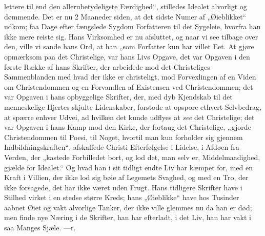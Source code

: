 \documentclass[12pt,a4paper]{book}
\begin{document}
lettere til end den allerubetydeligste Færdighed“, stilledes Idealet alvorligt og dømmende. Det er nu 2 Maaneder siden, at det sidste Numer af „Øieblikket“ udkom; faa Dage efter fængslede Sygdom Forfatteren til det Sygeleie, hvorfra han ikke mere reiste sig.
Hans Virksomhed er nu afsluttet, og naar vi see tilbage over den, ville vi sande hans Ord, at han „som Forfatter kun har villet Eet. At gjøre opmærksom paa det Christelige, var hans Livs Opgave, det var Opgaven i den første Række af hans Skrifter, der arbeidede mod det Christeliges Sammenblanden med hvad der ikke er christeligt, mod Forvexlingen af en Viden om Christendommen og en Forvandlen af Existensen ved Christendommen; det var Opgaven i hans opbyggelige Skrifter, der, med dyb Kjendskab til det menneskelige Hjertes skjulte Lidenskaber, forstode at opspore ethvert Selvbedrag, at spærre enhver Udvei, ad hvilken det kunde udflyes at \emph{see} det Christelige; det var Opgaven i hans Kamp mod den Kirke, der fortaug det Christelige, „gjorde Christendommen til Poesi,
til Noget, hvortil man kun forholder sig gjennem Indbildningskraften“, afskaffede Christi Efterfølgelse i Lidelse, i Afdøen fra Verden, der „kastede Forbilledet bort, og lod det, man selv er, Middelmaadighed, gjælde for Idealet.“ Og hvad han i sit tidligt endte Liv har kæmpet for, med en Kraft i Villien, der ikke lod sig bøie af Legemets Svaghed, og med en Tro, der ikke forsagede, det har ikke været uden Frugt. Hans tidligere Skrifter have i Stilhed virket i en stedse større Kreds; hans „Øieblikke“ have hos Tusinder aabnet Øiet og vakt alvorlige Tanker, der ikke ville glemmes nu da han er død; men finde nye Næring i de Skrifter, han har efterladt, i det Liv, han har vakt i saa Manges Sjæle. \hfill ---r.
%
\end{document}
